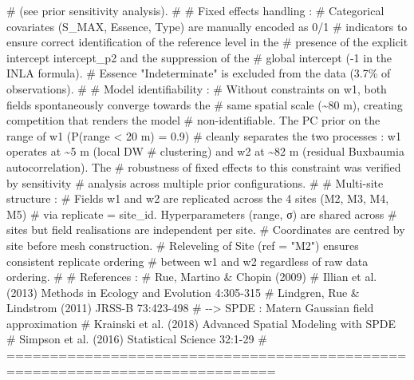 \documentclass[
  letterpaper,
  DIV=11,
  numbers=noendperiod]{scrartcl}
\newenvironment{Shaded}{\begin{snugshade}}{\end{snugshade}}
\newcommand{\CommentTok}[1]{\textcolor[rgb]{0.37,0.37,0.37}{#1}}
\begin{document}
\begin{Shaded}
\begin{Highlighting}[]
\CommentTok{\#   (see prior sensitivity analysis).}
\CommentTok{\#}
\CommentTok{\# Fixed effects handling :}
\CommentTok{\#   Categorical covariates (S\_MAX, Essence, Type) are manually encoded as 0/1}
\CommentTok{\#   indicators to ensure correct identification of the reference level in the}
\CommentTok{\#   presence of the explicit intercept intercept\_p2 and the suppression of the}
\CommentTok{\#   global intercept ({-}1 in the INLA formula).}
\CommentTok{\#   Essence "Indeterminate" is excluded from the data (3.7\% of observations).}
\CommentTok{\#}
\CommentTok{\# Model identifiability :}
\CommentTok{\#   Without constraints on w1, both fields spontaneously converge towards the}
\CommentTok{\#   same spatial scale (\textasciitilde{}80 m), creating competition that renders the model}
\CommentTok{\#   non{-}identifiable. The PC prior on the range of w1 (P(range \textless{} 20 m) = 0.9)}
\CommentTok{\#   cleanly separates the two processes : w1 operates at \textasciitilde{}5 m (local DW}
\CommentTok{\#   clustering) and w2 at \textasciitilde{}82 m (residual Buxbaumia autocorrelation). The}
\CommentTok{\#   robustness of fixed effects to this constraint was verified by sensitivity}
\CommentTok{\#   analysis across multiple prior configurations.}
\CommentTok{\#}
\CommentTok{\# Multi{-}site structure :}
\CommentTok{\#   Fields w1 and w2 are replicated across the 4 sites (M2, M3, M4, M5)}
\CommentTok{\#   via replicate = site\_id. Hyperparameters (range, σ) are shared across}
\CommentTok{\#   sites but field realisations are independent per site.}
\CommentTok{\#   Coordinates are centred by site before mesh construction.}
\CommentTok{\#   Releveling of Site (ref = "M2") ensures consistent replicate ordering}
\CommentTok{\#   between w1 and w2 regardless of raw data ordering.}
\CommentTok{\#}
\CommentTok{\# References :}
\CommentTok{\#   Rue, Martino \& Chopin (2009)}
\CommentTok{\#   Illian et al. (2013) Methods in Ecology and Evolution 4:305{-}315}
\CommentTok{\#   Lindgren, Rue \& Lindstrom (2011) JRSS{-}B 73:423{-}498}
\CommentTok{\#     {-}{-}\textgreater{} SPDE : Matern Gaussian field approximation}
\CommentTok{\#   Krainski et al. (2018) Advanced Spatial Modeling with SPDE}
\CommentTok{\#   Simpson et al. (2016) Statistical Science 32:1{-}29}
\CommentTok{\# =============================================================================}


\end{Highlighting}
\end{Shaded}
\end{document}
